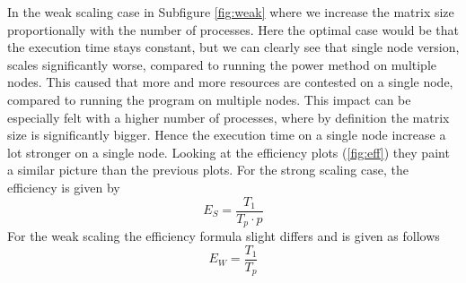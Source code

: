 In the weak scaling case in Subfigure \ref{fig:weak} where we increase the matrix size proportionally with the number of processes. Here the optimal case would be that the execution time stays constant, but we can clearly see that single node version, scales significantly worse, compared to running the power method on multiple nodes. This caused that more and more resources are contested on a single node, compared to running the program on multiple nodes. This impact can be especially felt with a higher number of processes, where by definition the matrix size is significantly bigger. Hence the execution time on a single node increase a lot stronger on a single node. \newline \newline
Looking at the efficiency plots (\ref{fig:eff}) they paint a similar picture than the previous plots.
For the strong scaling case, the efficiency is given by
\begin{equation}
	E_S = \frac{T_1}{T_p \cdot p}
\end{equation}
For the weak scaling the efficiency formula slight differs and is given as follows
\begin{equation}
	E_W = \frac{T_1}{T_p}
\end{equation}

